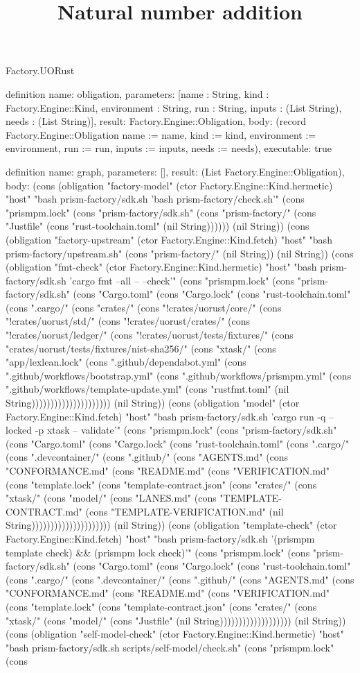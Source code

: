 \begin{lexlean}{Factory.UORust}
\title{Natural number addition}
\begin{semanticmodule}
definition{
  name: obligation,
  parameters: [name : String, kind : Factory.Engine::Kind, environment : String, run : String, inputs : (List String), needs : (List String)],
  result: Factory.Engine::Obligation,
  body: (record Factory.Engine::Obligation {name := name, kind := kind, environment := environment, run := run, inputs := inputs, needs := needs}),
  executable: true
}

definition{
  name: graph,
  parameters: [],
  result: (List Factory.Engine::Obligation),
  body: (cons (obligation "factory-model" (ctor Factory.Engine::Kind.hermetic) "host" "bash prism-factory/sdk.sh 'bash prism-factory/check.sh'" (cons "prismpm.lock" (cons "prism-factory/sdk.sh" (cons "prism-factory/" (cons "Justfile" (cons "rust-toolchain.toml" (nil String)))))) (nil String)) (cons (obligation "factory-upstream" (ctor Factory.Engine::Kind.fetch) "host" "bash prism-factory/upstream.sh" (cons "prism-factory/" (nil String)) (nil String)) (cons (obligation "fmt-check" (ctor Factory.Engine::Kind.hermetic) "host" "bash prism-factory/sdk.sh 'cargo fmt --all -- --check'" (cons "prismpm.lock" (cons "prism-factory/sdk.sh" (cons "Cargo.toml" (cons "Cargo.lock" (cons "rust-toolchain.toml" (cons ".cargo/" (cons "crates/" (cons "!crates/uorust/core/" (cons "!crates/uorust/std/" (cons "!crates/uorust/crates/" (cons "!crates/uorust/ledger/" (cons "!crates/uorust/tests/fixtures/" (cons "crates/uorust/tests/fixtures/nist-sha256/" (cons "xtask/" (cons "app/lexlean.lock" (cons ".github/dependabot.yml" (cons ".github/workflows/bootstrap.yml" (cons ".github/workflows/prismpm.yml" (cons ".github/workflows/template-update.yml" (cons "rustfmt.toml" (nil String))))))))))))))))))))) (nil String)) (cons (obligation "model" (ctor Factory.Engine::Kind.fetch) "host" "bash prism-factory/sdk.sh 'cargo run -q --locked -p xtask -- validate'" (cons "prismpm.lock" (cons "prism-factory/sdk.sh" (cons "Cargo.toml" (cons "Cargo.lock" (cons "rust-toolchain.toml" (cons ".cargo/" (cons ".devcontainer/" (cons ".github/" (cons "AGENTS.md" (cons "CONFORMANCE.md" (cons "README.md" (cons "VERIFICATION.md" (cons "template.lock" (cons "template-contract.json" (cons "crates/" (cons "xtask/" (cons "model/" (cons "LANES.md" (cons "TEMPLATE-CONTRACT.md" (cons "TEMPLATE-VERIFICATION.md" (nil String))))))))))))))))))))) (nil String)) (cons (obligation "template-check" (ctor Factory.Engine::Kind.fetch) "host" "bash prism-factory/sdk.sh '(prismpm template check) && (prismpm lock check)'" (cons "prismpm.lock" (cons "prism-factory/sdk.sh" (cons "Cargo.toml" (cons "Cargo.lock" (cons "rust-toolchain.toml" (cons ".cargo/" (cons ".devcontainer/" (cons ".github/" (cons "AGENTS.md" (cons "CONFORMANCE.md" (cons "README.md" (cons "VERIFICATION.md" (cons "template.lock" (cons "template-contract.json" (cons "crates/" (cons "xtask/" (cons "model/" (cons "Justfile" (nil String))))))))))))))))))) (nil String)) (cons (obligation "self-model-check" (ctor Factory.Engine::Kind.hermetic) "host" "bash prism-factory/sdk.sh scripts/self-model/check.sh" (cons "prismpm.lock" (cons }
\end{semanticmodule}
\end{lexlean}
